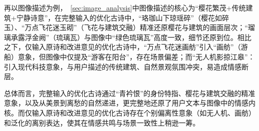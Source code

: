 再以图像描述为例，~\ref{sec:image_analysis}中图像描述的核心为“樱花繁茂+传统建筑+宁静诗意”，在完整输入的优化古诗中，“珞珈山下琼瑶碎”（樱花如碎玉）、“万点飞花迷玉砌”（飞花与建筑交融）精准还原樱花与建筑的画面层次；“瑠璃承露浮金阙”（琉璃瓦）与图像中“绿色琉璃瓦”高度一致，细节还原到位。相比之下，仅输入原诗和改进意见的优化古诗中，“万点飞花迷画舫”引入“画舫”（游船）意象，但图像中仅提及“游客在阳台”，存在场景偏差；而“无人机影掠江皋”：引入现代科技意象，与用户描述的传统建筑、自然景观氛围冲突，易造成情感断层。%

总体而言，完整输入的优化古诗通过“青衿恨”的身份特指、樱花与建筑交融的精准意象，以及从美景到离愁的自然递进，更完整地还原了用户文本与图像中的情感内核。而仅输入原诗和改进意见的优化古诗存在个别偏离性意象（如无人机、画舫）和泛化的离别表达，使其在情感共鸣与场景一致性上稍逊一筹。






